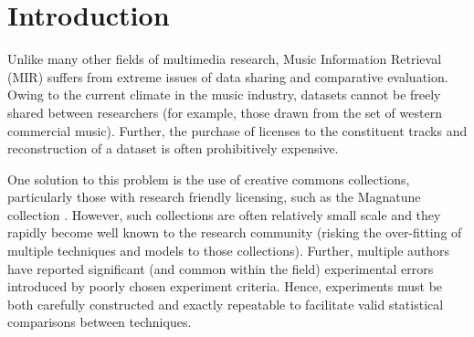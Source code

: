 \documentclass[conference]{IEEEtran}
\begin{document}
%





\section{Introduction}
Unlike many other fields of multimedia research, Music Information Retrieval (MIR) suffers from extreme issues of data sharing and comparative evaluation. Owing to the current climate in the music industry, datasets cannot be freely shared between researchers (for example, those drawn from the set of western commercial music). Further, the purchase of licenses to the constituent tracks and reconstruction of a dataset is often prohibitively expensive. 

One solution to this problem is the use of creative commons collections, particularly those with research friendly licensing, such as the Magnatune collection \cite{magnatune}. However, such collections are often relatively small scale and they rapidly become well known to the research community (risking the over-fitting of multiple techniques and models to those collections). Further, multiple authors \cite{albumeffect,pampalk:thesis} have reported significant (and common within the field) experimental errors introduced by poorly chosen experiment criteria. Hence, experiments must be both carefully constructed and exactly repeatable to facilitate valid statistical comparisons between techniques.
\end{document}
